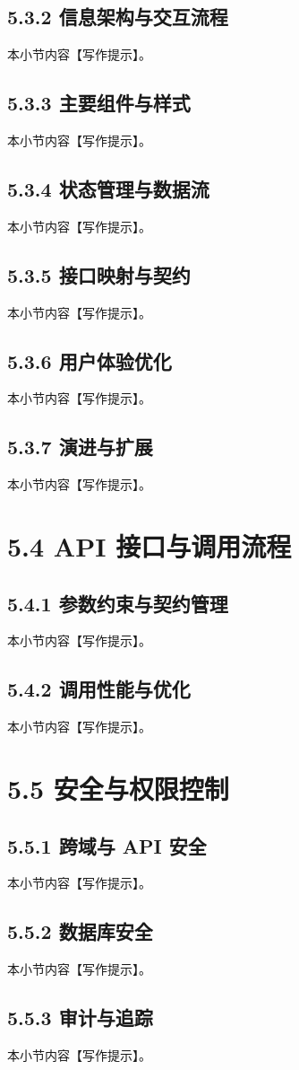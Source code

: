 \subsection{5.3.2 信息架构与交互流程}
本小节内容【写作提示】。
\subsection{5.3.3 主要组件与样式}
本小节内容【写作提示】。
\subsection{5.3.4 状态管理与数据流}
本小节内容【写作提示】。
\subsection{5.3.5 接口映射与契约}
本小节内容【写作提示】。
\subsection{5.3.6 用户体验优化}
本小节内容【写作提示】。
\subsection{5.3.7 演进与扩展}
本小节内容【写作提示】。
\section{5.4 API 接口与调用流程}
\subsection{5.4.1 参数约束与契约管理}
本小节内容【写作提示】。
\subsection{5.4.2 调用性能与优化}
本小节内容【写作提示】。
\section{5.5 安全与权限控制}
\subsection{5.5.1 跨域与 API 安全}
本小节内容【写作提示】。
\subsection{5.5.2 数据库安全}
本小节内容【写作提示】。
\subsection{5.5.3 审计与追踪}
本小节内容【写作提示】。
